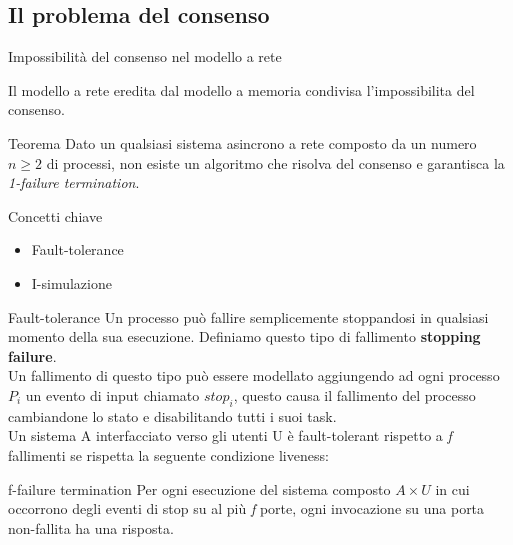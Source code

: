 \documentclass{beamer}
\begin{document}
\subsection{Il problema del consenso}

\begin{frame}{Impossibilità del consenso nel modello a rete}

    Il modello a rete eredita dal modello a memoria condivisa l'impossibilita del consenso.

    \begin{block}{Teorema}
        Dato un qualsiasi sistema asincrono a rete composto da un numero $n \geq 2$ di processi, non esiste un algoritmo che risolva del consenso e garantisca la \textit{1-failure termination}.
    \end{block}
\end{frame}

\begin{frame}{Concetti chiave}
    \begin{itemize}
        \item Fault-tolerance %
        \item I-simulazione
    \end{itemize}
\end{frame}

\begin{frame}{Fault-tolerance}
    Un processo può fallire semplicemente stoppandosi in qualsiasi momento della sua esecuzione. Definiamo questo tipo di fallimento \textbf{stopping failure}. 
    \\[10pt]
    Un fallimento di questo tipo può essere modellato aggiungendo ad ogni processo $P_{i}$ un evento di input chiamato \textit{$stop_{i}$}, questo causa il fallimento del processo cambiandone lo stato e disabilitando tutti i suoi task. 
    \\[10pt]
    Un sistema A interfacciato verso gli utenti U è fault-tolerant rispetto a \textit{f} fallimenti se rispetta la seguente condizione liveness:
    \begin{block}{f-failure termination}
        Per ogni esecuzione del sistema composto $A \times U$ in cui occorrono degli eventi di stop su al più \textit{f} porte, ogni invocazione su una porta non-fallita ha una risposta.
    \end{block}

\end{frame}
\end{document}
